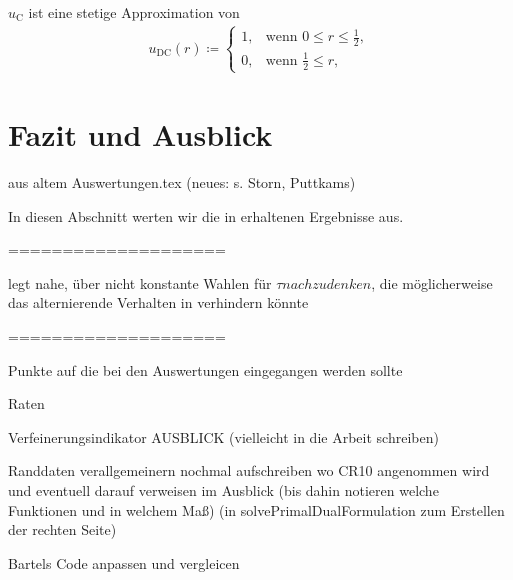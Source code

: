 $u_\textrm{C}$ ist eine stetige Approximation von
\begin{align*}
  u_\textrm{DC}(r)\coloneqq 
  \begin{cases}
    1, & \text{wenn } 0\leq r\leq\frac{1}{2},\\
    0, & \text{wenn } \frac{1}{2}\leq r,
  \end{cases}
\end{align*}


\section{Fazit und Ausblick}

aus altem Auswertungen.tex (neues: s. Storn, Puttkams)

In diesen Abschnitt werten wir die in  erhaltenen
Ergebnisse aus.


====================

 legt nahe, über nicht konstante Wahlen für
$\tau nachzudenken$, die möglicherweise das alternierende Verhalten in
 verhindern könnte

====================

Punkte auf die bei den Auswertungen eingegangen werden sollte

Raten

Verfeinerungsindikator
AUSBLICK (vielleicht in die Arbeit schreiben)
  
  Randdaten verallgemeinern
    nochmal aufschreiben wo CR10 angenommen wird und eventuell darauf verweisen 
    im Ausblick (bis dahin notieren welche Funktionen und in welchem Maß)
    (in solvePrimalDualFormulation zum Erstellen der rechten Seite)
    
  Bartels Code anpassen und vergleicen

